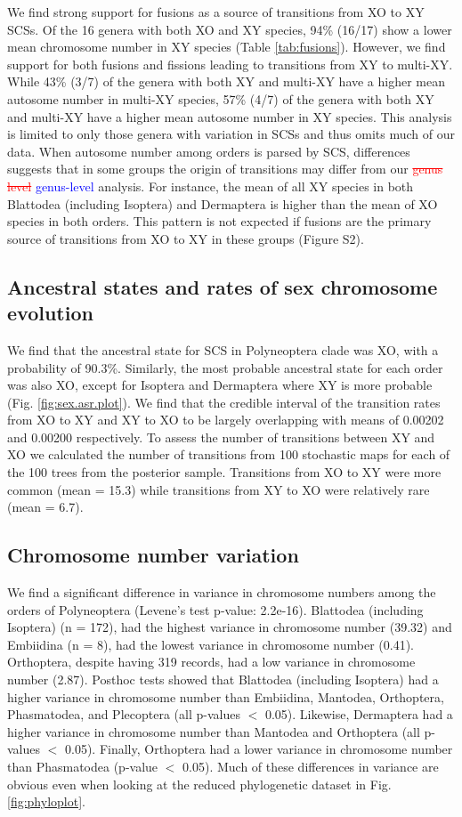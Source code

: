 \documentclass[]{rsos}%
\begin{document}
We find strong support for fusions as a source of transitions from XO to XY SCSs.
Of the 16 genera with both XO and XY species, 94\% (16/17) show a lower mean chromosome number in XY species (Table \ref{tab:fusions}). 
However, we find support for both fusions and fissions leading to transitions from XY to multi-XY.
While 43\% (3/7) of the genera with both XY and multi-XY have a higher mean autosome number in multi-XY species, 57\% (4/7) of the genera with both XY and multi-XY have a higher mean autosome number in XY species.
This analysis is limited to only those genera with variation in SCSs and thus omits much of our data.
When autosome number among orders is parsed by SCS, differences suggests that in some groups the origin of transitions may differ from our \textcolor{red}{\st{genus level}} \textcolor{blue}{genus-level} analysis.
For instance, the mean of all XY species in both Blattodea (including Isoptera) and Dermaptera is higher than the mean of XO species in both orders.
This pattern is not expected if fusions are the primary source of transitions from XO to XY in these groups (Figure S2).

\subsection{Ancestral states and rates of sex chromosome evolution}

We find that the ancestral state for SCS in Polyneoptera clade was XO, with a probability of 90.3\%.
Similarly, the most probable ancestral state for each order was also XO, except for Isoptera and Dermaptera where XY is more probable (Fig. \ref{fig:sex.asr.plot}).
We find that the credible interval of the transition rates from XO to XY and XY to XO to be largely overlapping with means of 0.00202 and 0.00200 respectively. 
To assess the number of transitions between XY and XO we calculated the number of transitions from 100 stochastic maps for each of the 100 trees from the posterior sample.
Transitions from XO to XY were more common (mean = 15.3) while transitions from XY to XO were relatively rare (mean = 6.7).

\subsection{Chromosome number variation}
We find a significant difference in variance in chromosome numbers among the orders of Polyneoptera (Levene's test p-value: 2.2e-16). 
Blattodea (including Isoptera) (n = 172), had the highest variance in chromosome number (39.32) and  Embiidina (n = 8), had the lowest variance in chromosome number (0.41).
Orthoptera, despite having 319 records, had a low variance in chromosome number (2.87). 
Posthoc tests showed that Blattodea (including Isoptera) had a higher variance in chromosome number than Embiidina, Mantodea, Orthoptera, Phasmatodea, and Plecoptera (all p-values $<$ 0.05). 
Likewise, Dermaptera had a higher variance in chromosome number than Mantodea and Orthoptera (all p-values $<$ 0.05). Finally, Orthoptera had a lower variance in chromosome number than Phasmatodea (p-value $<$ 0.05).
Much of these differences in variance are obvious even when looking at the reduced phylogenetic dataset in Fig. \ref{fig:phyloplot}.
\end{document}
